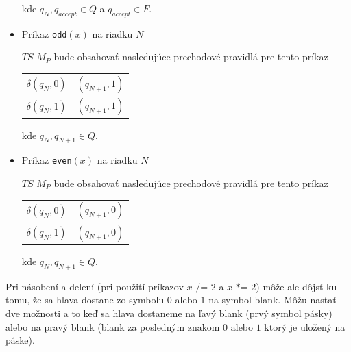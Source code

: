 \documentclass[11pt,a4paper]{article}
\begin{document}
\begin{itemize}
\begin{flushright}
\begin{minipage}{0.90\textwidth}
\begin{center}
\begin{tabular}{r@{ $=$ }l}
            \end{tabular}
            \end{center}
            kde $q_{N}, q_{accept} \in Q$ a $q_{accept} \in F$.
        \end{minipage}
        \end{flushright}
    \item Príkaz \texttt{odd}$(x)$ na riadku $N$\\[-1.5em]
        \begin{flushright}
        \begin{minipage}{0.90\textwidth}
            $TS$ $M_P$ bude obsahovať nasledujúce prechodové pravidlá pre tento príkaz
            \begin{center}
            \begin{tabular}{r@{ $=$ }l}
                $\delta(q_{N}, 0)$ & $(q_{N+1}, 1)$\\
                $\delta(q_{N}, 1)$ & $(q_{N+1}, 1)$
            \end{tabular}
            \end{center}
            kde $q_{N}, q_{N+1} \in Q$.
        \end{minipage}
        \end{flushright}
    \item Príkaz \texttt{even}$(x)$ na riadku $N$\\[-1.5em]
        \begin{flushright}
        \begin{minipage}{0.90\textwidth}
            $TS$ $M_P$ bude obsahovať nasledujúce prechodové pravidlá pre tento príkaz
            \begin{center}
            \begin{tabular}{r@{ $=$ }l}
                $\delta(q_{N}, 0)$ & $(q_{N+1}, 0)$\\
                $\delta(q_{N}, 1)$ & $(q_{N+1}, 0)$
            \end{tabular}
            \end{center}
            kde $q_{N}, q_{N+1} \in Q$.
        \end{minipage}
        \end{flushright}
\end{itemize}

Pri násobení a delení (pri použití príkazov $x \texttt{ /= } 2$ a $x \texttt{ *= } 2$) môže ale dôjsť ku tomu, že sa hlava dostane zo symbolu $0$ alebo $1$ na symbol blank. Môžu nastať dve možnosti a to keď sa hlava dostaneme na ľavý blank (prvý symbol pásky) alebo na pravý blank (blank za posledným znakom $0$ alebo $1$ ktorý je uložený na páske).
\end{document}
